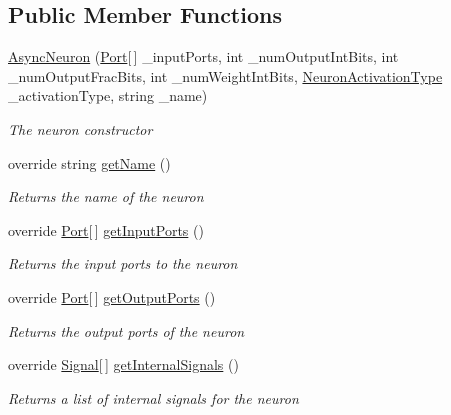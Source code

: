\subsection*{Public Member Functions}
\begin{DoxyCompactItemize}
\item 
\hyperlink{class_n_n_gen_1_1_async_neuron_a38668566c40b9e34ce3f36b692fbb1ea}{Async\+Neuron} (\hyperlink{class_n_n_gen_1_1_port}{Port}\mbox{[}$\,$\mbox{]} \+\_\+input\+Ports, int \+\_\+num\+Output\+Int\+Bits, int \+\_\+num\+Output\+Frac\+Bits, int \+\_\+num\+Weight\+Int\+Bits, \hyperlink{class_n_n_gen_1_1_async_neuron_afe8460a52808d1587cbcc0a8e4e23b64}{Neuron\+Activation\+Type} \+\_\+activation\+Type, string \+\_\+name)
\begin{DoxyCompactList}\small\item\em The neuron constructor \end{DoxyCompactList}\item 
override string \hyperlink{class_n_n_gen_1_1_async_neuron_a28513dfbc9af1012436c00d02322c278}{get\+Name} ()
\begin{DoxyCompactList}\small\item\em Returns the name of the neuron \end{DoxyCompactList}\item 
override \hyperlink{class_n_n_gen_1_1_port}{Port}\mbox{[}$\,$\mbox{]} \hyperlink{class_n_n_gen_1_1_async_neuron_a76ace6a3638e3f47135fd010ebfee4a0}{get\+Input\+Ports} ()
\begin{DoxyCompactList}\small\item\em Returns the input ports to the neuron \end{DoxyCompactList}\item 
override \hyperlink{class_n_n_gen_1_1_port}{Port}\mbox{[}$\,$\mbox{]} \hyperlink{class_n_n_gen_1_1_async_neuron_ad10df3705cc6c39aaec226b0730a687e}{get\+Output\+Ports} ()
\begin{DoxyCompactList}\small\item\em Returns the output ports of the neuron \end{DoxyCompactList}\item 
override \hyperlink{class_n_n_gen_1_1_signal}{Signal}\mbox{[}$\,$\mbox{]} \hyperlink{class_n_n_gen_1_1_async_neuron_aeb97d091f87eae66eeb865557d674b72}{get\+Internal\+Signals} ()
\begin{DoxyCompactList}\small\item\em Returns a list of internal signals for the neuron \end{DoxyCompactList}\item 

\end{DoxyCompactItemize}
